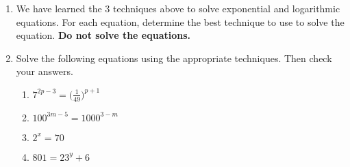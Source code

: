 \begin{enumerate}

\item We have learned the 3 techniques above to solve exponential and logarithmic equations.  For each equation, determine the best technique to use to solve the equation.  \textbf{Do not solve the equations.}
\begin{enumerate}
\end{enumerate}


\item Solve the following equations using the appropriate techniques.  Then check your answers.
\begin{enumerate}

\newpage
\item $\displaystyle 7^{2p-3}=\Big(\frac{1}{49}\Big)^{p+1}$
\vfill

\item $100^{3m-5}=1000^{3-m}$
\vfill

\item $2^x=70$
\vfill

\item $801=23^y+6$
\vfill
\newpage


\end{enumerate}
\end{enumerate}
